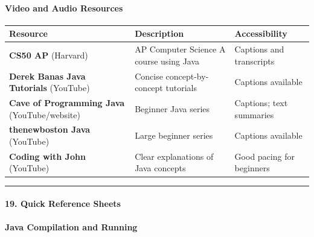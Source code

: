 \documentclass[
  justified,
  openright,
]{tufte-book}
\let\subsection\paragraph
\let\paragraph\paragraph
\let\subsection\paragraph
\let\paragraph\paragraph
\begin{document}
\subsection{Video and Audio
Resources}\label{video-and-audio-resources-1}

\begin{fullwidth}{\def\LTcaptype{none} %
\begin{longtable}[]{@{}
  >{\raggedright\arraybackslash}p{}
  >{\raggedright\arraybackslash}p{}
  >{\raggedright\arraybackslash}p{}@{}}
\toprule\noalign{}
\begin{minipage}[b]{\linewidth}\raggedright
Resource
\end{minipage} & \begin{minipage}[b]{\linewidth}\raggedright
Description
\end{minipage} & \begin{minipage}[b]{\linewidth}\raggedright
Accessibility
\end{minipage} \\
\midrule\noalign{}
\endhead
\bottomrule\noalign{}
\endlastfoot
\textbf{CS50 AP} (Harvard) & AP Computer Science A course using Java &
Captions and transcripts \\
\textbf{Derek Banas Java Tutorials} (YouTube) & Concise
concept-by-concept tutorials & Captions available \\
\textbf{Cave of Programming Java} (YouTube/website) & Beginner Java
series & Captions; text summaries \\
\textbf{thenewboston Java} (YouTube) & Large beginner series & Captions
available \\
\textbf{Coding with John} (YouTube) & Clear explanations of Java
concepts & Good pacing for beginners \\
\end{longtable}
}
\end{fullwidth}

\begin{center}\rule{0.5\linewidth}{0.5pt}\end{center}

\subsection{19. Quick Reference Sheets}\label{quick-reference-sheets-2}

\subsection{Java Compilation and
Running}\label{java-compilation-and-running}
\end{document}
